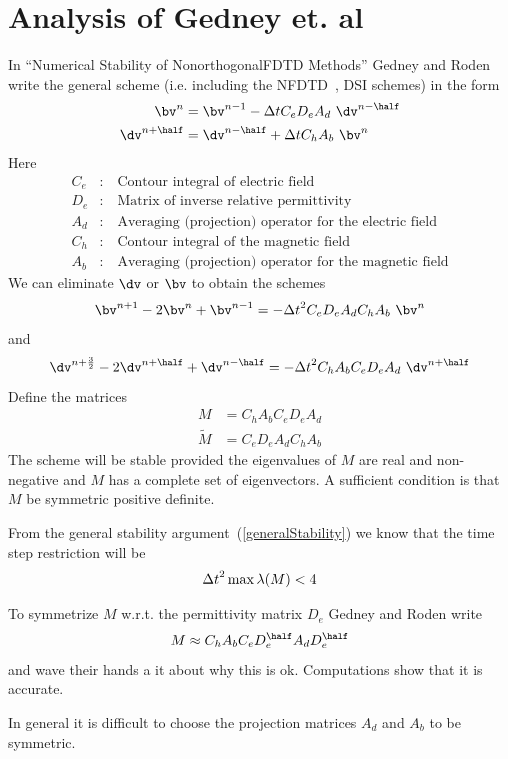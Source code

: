 \documentclass[10pt]{article}
\begin{document}
\clearpage
\section{Analysis of Gedney et. al}

In ``Numerical Stability of NonorthogonalFDTD Methods'' Gedney and Roden\cite{GedneyRoden2000}
write the general scheme (i.e. including the NFDTD~\cite{Lee92}, DSI schemes) in the form
\begin{align*}
   \bv^n &= \bv^{n-1} - \dt C_e D_e A_d ~\dv^{n-\half} \\
   \dv^{n+\half} &= \dv^{n-\half} + \dt C_h A_b ~\bv^{n}
\end{align*} 
Here
\begin{align*}
   C_e & :\quad\mbox{Contour integral of electric field} \\
   D_e & :\quad\mbox{Matrix of inverse relative permittivity} \\
   A_d & :\quad\mbox{Averaging (projection) operator for the electric field} \\
   C_h & :\quad\mbox{Contour integral of the magnetic field} \\
   A_b & :\quad\mbox{Averaging (projection) operator for the magnetic field} 
\end{align*} 
We can eliminate $\dv$ or $\bv$ to obtain the schemes
\[
   \bv^{n+1} - 2 \bv^n +\bv^{n-1} = - \dt^2 C_e D_e A_d C_h A_b ~\bv^n
\]
and
\[
\dv^{n+{3\over2}} -2 \dv^{n+\half} + \dv^{n-\half} = -\dt^2 C_h A_b C_e D_e A_d  ~\dv^{n+\half}
\]
Define the matrices
\begin{align*}
   M &= C_h A_b C_e D_e A_d \\
   \tilde{M} &= C_e D_e A_d C_h A_b
\end{align*}
The scheme will be stable provided the eigenvalues of $M$ are real and non-negative and $M$
has a complete set of eigenvectors. A sufficient condition is that $M$ be symmetric positive definite.

From the general stability argument~(\ref{generalStability}) we know that the time step restriction will be
\[
   {\Delta t}^2 \max \lambda(M) < 4
\]


To symmetrize $M$ w.r.t. the permittivity matrix $D_e$ Gedney and Roden\cite{GedneyRoden2000} write
\[
  M \approx C_h A_b C_e D_e^\half A_d D_e^\half
\]
and wave their hands a it about why this is ok. Computations show that it is accurate.

In general it is difficult to choose the projection matrices $A_d$ and $A_b$ to be symmetric.
\end{document}
